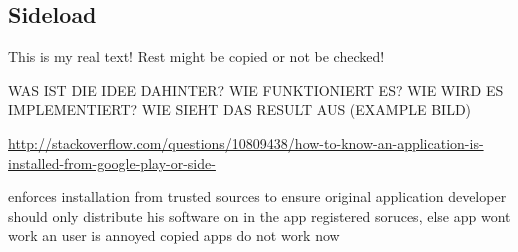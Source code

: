 \subsection{Sideload} \label{subsection:counter-tampering-sideload}
This is my real text! Rest might be copied or not be checked!

WAS IST DIE IDEE DAHINTER? WIE FUNKTIONIERT ES? WIE WIRD ES IMPLEMENTIERT? WIE SIEHT DAS RESULT AUS (EXAMPLE BILD)\newline

\url{http://stackoverflow.com/questions/10809438/how-to-know-an-application-is-installed-from-google-play-or-side-}

enforces installation from trusted sources to ensure original application
developer should only distribute his software on in the app registered soruces, else app wont work an user is annoyed
copied apps do not work now

